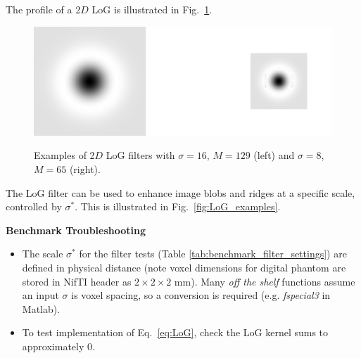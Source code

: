 \documentclass[fleqn,a4paper,oneside,openany]{book}
\begin{document}
The profile of a 2$D$ LoG is illustrated in Fig.~\ref{fig:LoG}.
%
\begin{figure}
\centering
\includegraphics[trim = 0 0 0 0, clip, scale=0.8]{LoG.png}\\
\caption{Examples of 2$D$ LoG filters with $\sigma=16$, $M=129$ (left) and $\sigma=8$, $M=65$ (right).}
  \label{fig:LoG}
\end{figure}
%
The LoG filter can be used to enhance image blobs and ridges at a specific scale, controlled by $\sigma^*$.
This is illustrated in Fig.~\ref{fig:LoG_examples}.

\vspace{2mm}
\begin{tcolorbox}[width=150mm, halign=left, colframe=black, colback=white, boxsep=0mm,arc=3mm]
\textbf{Benchmark Troubleshooting}
\begin{itemize}
\item The scale $\sigma^*$ for the filter tests (Table \ref{tab:benchmark_filter_settings}) are defined in physical distance (note voxel dimensions for digital phantom are stored in NifTI header as $2 \times 2 \times 2$ mm). Many \textit{off the shelf} functions assume an input $\sigma$ is voxel spacing, so a conversion is required (e.g. \textit{fspecial3} in Matlab).
\item To test implementation of Eq.\ \ref{eq:LoG}, check the LoG kernel sums to approximately 0. 
\end{itemize}
\end{tcolorbox}
\end{document}
